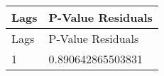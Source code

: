 \begin{tabular}{ll}
\hline
 Lags   & P-Value Residuals   \\
\hline
 Lags   & P-Value Residuals   \\
 1      & 0.890642865503831   \\
\hline
\end{tabular}